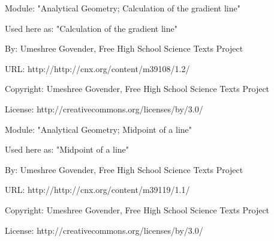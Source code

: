       \par\vspace{9pt}\noindent\begin{minipage}{\textwidth}
      Module: "Analytical Geometry; Calculation of the gradient line" \par\nopagebreak\noindent
      Used here as: "Calculation of the gradient line" \par\nopagebreak\noindent
        By: Umeshree Govender, Free High School Science Texts Project\par\nopagebreak\noindent
      URL: http://http://cnx.org/content/m39108/1.2/\par\nopagebreak\noindent
      \par\nopagebreak\noindent
      Copyright: Umeshree Govender, Free High School Science Texts Project\par\nopagebreak\noindent
      License:  http://creativecommons.org/licenses/by/3.0/\par\nopagebreak\noindent
      \par\end{minipage}
      \par\vspace{9pt}\noindent\begin{minipage}{\textwidth}
      Module: "Analytical Geometry; Midpoint of a line" \par\nopagebreak\noindent
      Used here as: "Midpoint of a line" \par\nopagebreak\noindent
        By: Umeshree Govender, Free High School Science Texts Project\par\nopagebreak\noindent
      URL: http://http://cnx.org/content/m39119/1.1/\par\nopagebreak\noindent
      \par\nopagebreak\noindent
      Copyright: Umeshree Govender, Free High School Science Texts Project\par\nopagebreak\noindent
      License:  http://creativecommons.org/licenses/by/3.0/\par\nopagebreak\noindent
      \par\end{minipage}
